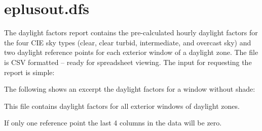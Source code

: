 \section{eplusout.dfs}\label{eplusout.dfs}

The daylight factors report contains the pre-calculated hourly daylight factors for the four CIE sky types (clear, clear turbid, intermediate, and overcast sky) and two daylight reference points for each exterior window of a daylight zone. The file is CSV formatted -- ready for spreadsheet viewing. The input for requesting the report is simple:

The following shows an excerpt the daylight factors for a window without shade:

This file contains daylight factors for all exterior windows of daylight zones.

If only one reference point the last 4 columns in the data will be zero.

